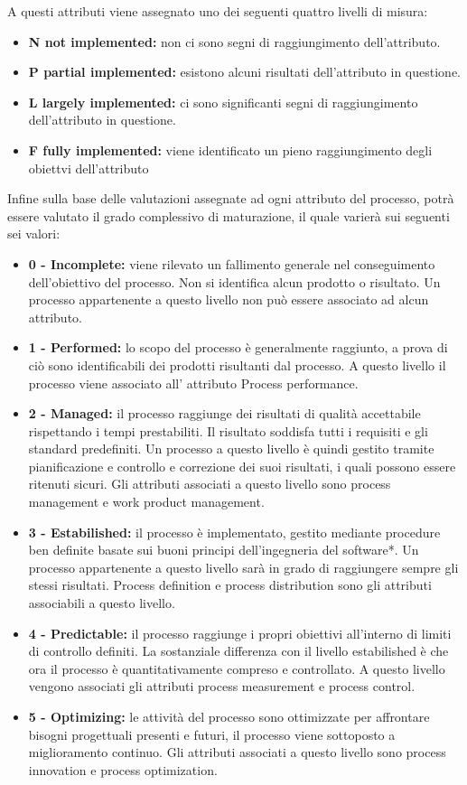 	A questi attributi viene assegnato uno dei seguenti quattro livelli di misura:
	\begin{itemize}
	\item \textbf{N not implemented:} non ci sono segni di raggiungimento dell'attributo.
	\item \textbf{P partial implemented:} esistono alcuni risultati dell'attributo in questione.
	\item \textbf{L largely implemented:} ci sono significanti segni di raggiungimento dell'attributo in questione.
	\item \textbf{F fully implemented:} viene identificato un pieno raggiungimento degli obiettvi dell'attributo
	\end{itemize}
	Infine sulla base delle valutazioni assegnate ad ogni attributo del processo, potrà essere valutato il grado complessivo di maturazione, il quale varierà sui seguenti sei valori:
	\begin{itemize}
	\item \textbf{0 - Incomplete:} viene rilevato un fallimento generale nel conseguimento dell'obiettivo del processo. Non si identifica alcun prodotto o risultato. Un processo appartenente a questo livello non può essere associato ad alcun attributo.
	\item \textbf{1 - Performed:} lo scopo del processo è generalmente raggiunto, a prova di ciò sono identificabili dei prodotti risultanti dal processo. A questo livello il processo viene associato all' attributo Process performance.
	\item \textbf{2 - Managed:} il processo raggiunge dei risultati di qualità accettabile rispettando i tempi prestabiliti. Il risultato soddisfa tutti i requisiti e gli standard predefiniti. Un processo a questo livello è quindi gestito tramite pianificazione e controllo e correzione dei suoi risultati, i quali possono essere ritenuti sicuri. Gli attributi associati a questo livello sono process management e work product management.
	\item \textbf{3 - Estabilished:} il processo è implementato, gestito mediante procedure ben definite basate sui buoni principi dell'ingegneria del software*. Un processo appartenente a questo livello sarà in grado di raggiungere sempre gli stessi risultati. Process definition e process distribution sono gli attributi associabili a questo livello.
	\item \textbf{4 - Predictable:} il processo raggiunge i propri obiettivi all'interno di limiti di controllo definiti. La sostanziale differenza con il livello estabilished è che ora il processo è quantitativamente compreso e controllato. A questo livello vengono associati gli attributi process measurement e process control.
	\item \textbf{5 - Optimizing:} le attività del processo sono ottimizzate per affrontare bisogni progettuali presenti e futuri, il processo viene sottoposto a miglioramento continuo. Gli attributi associati a questo livello sono process innovation e process optimization.
	\end{itemize}
